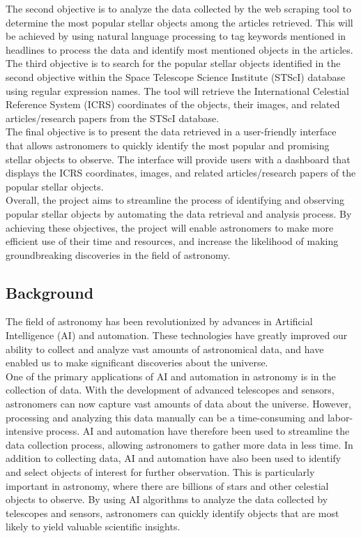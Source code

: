 \documentclass[12pt,letterpaper]{article}
\begin{document}
The second objective is to analyze the data collected by the web scraping tool 
to determine the most popular stellar objects among the articles retrieved. This 
will be achieved by using natural language processing to tag keywords mentioned 
in headlines to process the data and identify most mentioned objects in the articles.\\

The third objective is to search for the popular stellar objects identified in 
the second objective within the Space Telescope Science Institute (STScI) database 
using regular expression names. The tool will retrieve the  International 
Celestial Reference System (ICRS) coordinates of the objects, their images, 
and related articles/research papers from the STScI database.\\

The final objective is to present the data retrieved in a user-friendly interface 
that allows astronomers to quickly identify the most popular and promising stellar 
objects to observe. The interface will provide users with a dashboard that displays 
the ICRS coordinates, images, and related articles/research papers of the popular stellar objects.\\

Overall, the project aims to streamline the process of identifying and observing 
popular stellar objects by automating the data retrieval and analysis process. 
By achieving these objectives, the project will enable astronomers to make more 
efficient use of their time and resources, and increase the likelihood of making 
groundbreaking discoveries in the field of astronomy.\\

\subsection*{Background}
The field of astronomy has been revolutionized by advances in Artificial Intelligence 
(AI) and automation. These technologies have greatly improved our ability to collect 
and analyze vast amounts of astronomical data, and have enabled us to make significant 
discoveries about the universe.\\

One of the primary applications of AI and automation in astronomy is in the collection 
of data. With the development of advanced telescopes and sensors, astronomers can now 
capture vast amounts of data about the universe. However, processing and analyzing 
this data manually can be a time-consuming and labor-intensive process. AI and automation 
have therefore been used to streamline the data collection process, allowing astronomers 
to gather more data in less time. In addition to collecting data, AI and automation have 
also been used to identify and select objects of interest for further observation. 
This is particularly important in astronomy, where there are billions of stars and 
other celestial objects to observe. By using AI algorithms to analyze the data collected 
by telescopes and sensors, astronomers can quickly identify objects that are most likely 
to yield valuable scientific insights.\\
\end{document}
